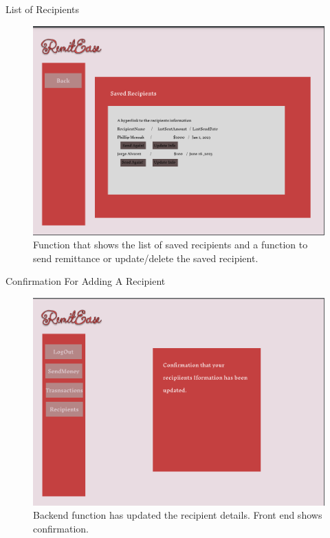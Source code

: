\documentclass{beamer}
\begin{document}
\begin{frame}{List of Recipients}
    \begin{figure}
        \centering
        \includegraphics[width=.7\linewidth]{MockUps/Recipients.PNG}
        \caption{Function that shows the list of saved recipients and a function to send remittance or update/delete the saved recipient.}
        \label{fig:enter-label}
    \end{figure}
\end{frame}

\begin{frame}{Confirmation For Adding A Recipient}
    \begin{figure}
        \centering
        \includegraphics[width=.7\linewidth]{MockUps/RecipientUpdateConfirmation.PNG}
        \caption{Backend function has updated the recipient details. Front end shows confirmation.}
        \label{fig:enter-label}
    \end{figure}
\end{frame}
\end{document}
